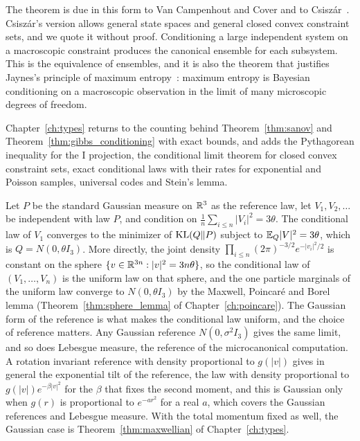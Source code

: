 The theorem is due in this form to Van Campenhout and Cover and to Csisz\'ar~\cite{vancampenhoutcover1981,csiszar1984}. Csisz\'ar's version allows general state spaces and general closed convex constraint sets, and we quote it without proof. Conditioning a large independent system on a macroscopic constraint produces the canonical ensemble for each subsystem. This is the equivalence of ensembles, and it is also the theorem that justifies Jaynes's principle of maximum entropy~\cite{jaynes1957}: maximum entropy is Bayesian conditioning on a macroscopic observation in the limit of many microscopic degrees of freedom.

Chapter~\ref{ch:types} returns to the counting behind Theorem~\ref{thm:sanov} and Theorem~\ref{thm:gibbs_conditioning} with exact bounds, and adds the Pythagorean inequality for the I projection, the conditional limit theorem for closed convex constraint sets, exact conditional laws with their rates for exponential and Poisson samples, universal codes and Stein's lemma.

\begin{example}
\label{ex:maxwellian}
Let $P$ be the standard Gaussian measure on $\mathbb{R}^3$ as the reference law, let $V_1,V_2,\dots$ be independent with law $P$, and condition on $\frac1n\sum_{i\leq n}|V_i|^2 = 3\theta$. The conditional law of $V_1$ converges to the minimizer of $\mathrm{KL}(Q\|P)$ subject to $\mathbb{E}_Q|V|^2 = 3\theta$, which is $Q = N(0,\theta I_3)$. More directly, the joint density $\prod_{i\leq n}(2\pi)^{-3/2}e^{-|v_i|^2/2}$ is constant on the sphere $\{v\in\mathbb{R}^{3n}:|v|^2 = 3n\theta\}$, so the conditional law of $(V_1,\dots,V_n)$ is the uniform law on that sphere, and the one particle marginals of the uniform law converge to $N(0,\theta I_3)$ by the Maxwell, Poincar\'e and Borel lemma (Theorem~\ref{thm:sphere_lemma} of Chapter~\ref{ch:poincare}). The Gaussian form of the reference is what makes the conditional law uniform, and the choice of reference matters. Any Gaussian reference $N(0,\sigma^2I_3)$ gives the same limit, and so does Lebesgue measure, the reference of the microcanonical computation. A rotation invariant reference with density proportional to $g(|v|)$ gives in general the exponential tilt of the reference, the law with density proportional to $g(|v|)e^{-\beta|v|^2}$ for the $\beta$ that fixes the second moment, and this is Gaussian only when $g(r)$ is proportional to $e^{-ar^2}$ for a real $a$, which covers the Gaussian references and Lebesgue measure. With the total momentum fixed as well, the Gaussian case is Theorem~\ref{thm:maxwellian} of Chapter~\ref{ch:types}.
\end{example}

